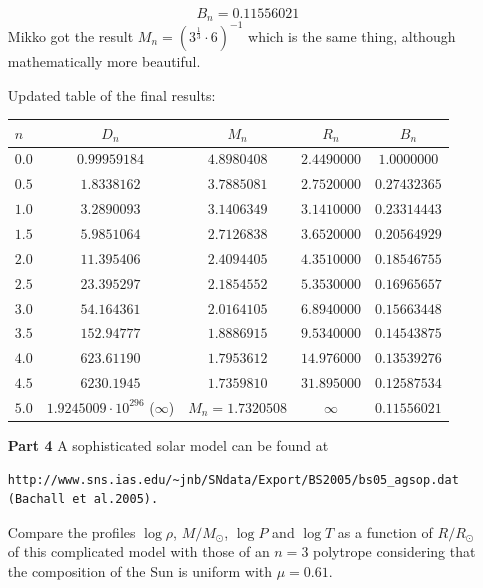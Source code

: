 \documentclass[a4paper,12pt]{article}
\begin{document}
\begin{itemize}
$$B_n=0.11556021$$
Mikko got the result $M_n=(3^{\frac{1}{3}} \cdot 6)^{-1}$ which is the same thing, although mathematically more beautiful.




Updated table of the final results:

\vspace{0.5cm}
\begin{tabular}{|l|c|c|c|c|}
\hline
$n$ & $D_n$ & $M_n$ & $R_n$ & $B_n$ \\
\hline
$0.0$ & $0.99959184$ & $4.8980408$ & $2.4490000$ & $1.0000000$ \\
$0.5$ & $1.8338162$ & $3.7885081$ & $2.7520000$ & $0.27432365$ \\
$1.0$ & $3.2890093$ & $3.1406349$ & $3.1410000$ & $0.23314443$ \\
$1.5$ & $5.9851064$ & $2.7126838$ & $3.6520000$ & $0.20564929$ \\
$2.0$ & $11.395406$ & $2.4094405$ & $4.3510000$ & $0.18546755$ \\
$2.5$ & $23.395297$ & $2.1854552$ & $5.3530000$ & $0.16965657$ \\
$3.0$ & $54.164361$ & $2.0164105$ & $6.8940000$ & $0.15663448$ \\
$3.5$ & $152.94777$ & $1.8886915$ & $9.5340000$ & $0.14543875$ \\
$4.0$ & $623.61190$ & $1.7953612$ & $14.976000$ & $0.13539276$ \\
$4.5$ & $6230.1945$ & $1.7359810$ & $31.895000$ & $0.12587534$ \\
$5.0$ & $1.9245009 \cdot 10^{296}$ ($\infty$) & $M_n=1.7320508$ & $\infty$ & $0.11556021$ \\
\hline
\end{tabular}

\newpage
\item[\textbf{Part 4}] A sophisticated solar model can be found at 
\begin{verbatim}
http://www.sns.ias.edu/~jnb/SNdata/Export/BS2005/bs05_agsop.dat 
(Bachall et al.2005).
\end{verbatim}

Compare the profiles $\log\rho$, $M/M_{\odot}$, $\log P$ and $\log T$ as a function of $R/R_{\odot}$ of this complicated model with those of an $n=3$ polytrope considering that the composition of the Sun is uniform with $\mu = 0.61$.


\end{itemize}
\end{document}
